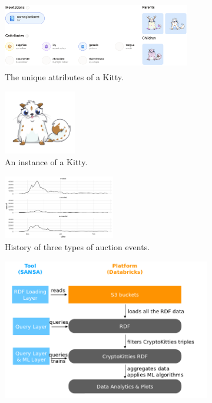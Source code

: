 \begin{figure}[t]
\caption{Leveraging Blockchain RDF Data with SANSA: CryptoKitties as a Use Case.}
\label{fig:crypto-sansa}
\begin{subfigure}[b]{0.95\textwidth}
\centering
\includegraphics[height=3cm,width=0.9\textwidth]{images/7_implemenation_and_usecases/kittie_attributes.png}
\caption{The unique attributes of a Kitty.}
\label{fig:attributes}
\end{subfigure}
\begin{subfigure}[b]{0.5\textwidth}
\centering
\includegraphics[height=2.8cm]{images/7_implemenation_and_usecases/kittie.png}
\caption{An instance of a Kitty.}
\label{fig:kitty}
\end{subfigure}
\begin{subfigure}[b]{0.5\textwidth}
\centering
\includegraphics[height=2.8cm,width=\textwidth]{images/7_implemenation_and_usecases/auction_event.png}
\caption{History of three types of auction events.}
\label{fig:auction}
\end{subfigure}
\begin{subfigure}[b]{0.5\textwidth}
\centering
\includegraphics[width=1\textwidth]{images/7_implemenation_and_usecases/CryptoSANSA-pipeline.png}

\end{subfigure}
\end{figure}
